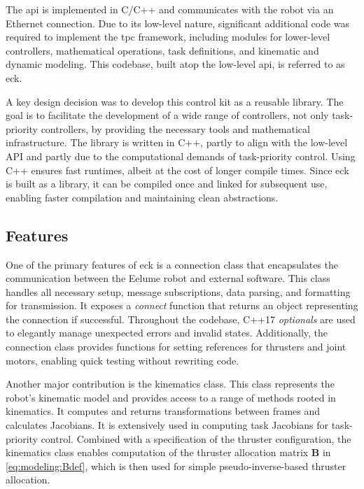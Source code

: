 The \gls{api} is implemented in C/C++ and communicates with the robot via an Ethernet connection. Due to its low-level nature, significant additional code was required to implement the \gls{tpc} framework, including modules for lower-level controllers, mathematical operations, task definitions, and kinematic and dynamic modeling. This codebase, built atop the low-level \gls{api}, is referred to as \gls{eck}.

A key design decision was to develop this control kit as a reusable library. The goal is to facilitate the development of a wide range of controllers, not only task-priority controllers, by providing the necessary tools and mathematical infrastructure. The library is written in C++, partly to align with the low-level API and partly due to the computational demands of task-priority control. Using C++ ensures fast runtimes, albeit at the cost of longer compile times. Since \gls{eck} is built as a library, it can be compiled once and linked for subsequent use, enabling faster compilation and maintaining clean abstractions.

\subsection{Features}

One of the primary features of \gls{eck} is a connection class that encapsulates the communication between the Eelume robot and external software. This class handles all necessary setup, message subscriptions, data parsing, and formatting for transmission. It exposes a \textit{connect} function that returns an object representing the connection if successful. Throughout the codebase, C++17 \textit{optionals} are used to elegantly manage unexpected errors and invalid states. Additionally, the connection class provides functions for setting references for thrusters and joint motors, enabling quick testing without rewriting code.

Another major contribution is the kinematics class. This class represents the robot’s kinematic model and provides access to a range of methods rooted in kinematics. It computes and returns transformations between frames and calculates Jacobians. It is extensively used in computing task Jacobians for task-priority control. Combined with a specification of the thruster configuration, the kinematics class enables computation of the thruster allocation matrix \(\bm{B}\) in \autoref{eq:modeling:Bdef}, which is then used for simple pseudo-inverse-based thruster allocation.

